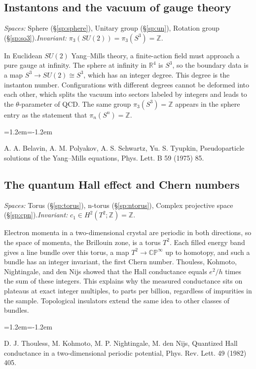 \documentclass[11pt,twoside]{book}
\begin{document}
\subsection{Instantons and the vacuum of gauge theory}\label{app:app-instanton}
\noindent\textit{Spaces:} Sphere (\S\ref{sp:sphere}), Unitary group (\S\ref{sp:un}), Rotation group (\S\ref{sp:so3}).\enspace\textit{Invariant:} $\pi_3(SU(2))=\pi_3(S^3)=\mathbb{Z}$.

In Euclidean $SU(2)$ Yang–Mills theory, a finite-action field must approach a pure gauge at infinity. The sphere at infinity in $\mathbb{R}^4$ is $S^3$, so the boundary data is a map $S^3\to SU(2)\cong S^3$, which has an integer degree. This degree is the instanton number. Configurations with different degrees cannot be deformed into each other, which splits the vacuum into sectors labeled by integers and leads to the $\theta$-parameter of QCD. The same group $\pi_3(S^3)=\mathbb{Z}$ appears in the sphere entry as the statement that $\pi_n(S^n)=\mathbb{Z}$.
\begin{list}{}{\leftmargin=1.2em\itemindent=-1.2em\itemsep=0pt}\small \item A. A. Belavin, A. M. Polyakov, A. S. Schwartz, Yu. S. Tyupkin, Pseudoparticle solutions of the Yang–Mills equations, Phys. Lett. B 59 (1975) 85.\end{list}
\subsection{The quantum Hall effect and Chern numbers}\label{app:app-hall}
\noindent\textit{Spaces:} Torus (\S\ref{sp:torus}), n-torus (\S\ref{sp:ntorus}), Complex projective space (\S\ref{sp:cpn}).\enspace\textit{Invariant:} $c_1\in H^2(T^2;\mathbb{Z})=\mathbb{Z}$.

Electron momenta in a two-dimensional crystal are periodic in both directions, so the space of momenta, the Brillouin zone, is a torus $T^2$. Each filled energy band gives a line bundle over this torus, a map $T^2\to\mathbb{CP}^\infty$ up to homotopy, and such a bundle has an integer invariant, the first Chern number. Thouless, Kohmoto, Nightingale, and den Nijs showed that the Hall conductance equals $e^2/h$ times the sum of these integers. This explains why the measured conductance sits on plateaus at exact integer multiples, to parts per billion, regardless of impurities in the sample. Topological insulators extend the same idea to other classes of bundles.
\begin{list}{}{\leftmargin=1.2em\itemindent=-1.2em\itemsep=0pt}\small \item D. J. Thouless, M. Kohmoto, M. P. Nightingale, M. den Nijs, Quantized Hall conductance in a two-dimensional periodic potential, Phys. Rev. Lett. 49 (1982) 405.\end{list}
\end{document}
